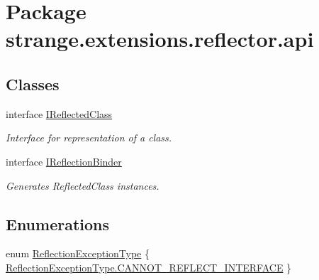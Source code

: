 \hypertarget{namespacestrange_1_1extensions_1_1reflector_1_1api}{\section{Package strange.\-extensions.\-reflector.\-api}
\label{namespacestrange_1_1extensions_1_1reflector_1_1api}
}
\subsection*{Classes}
\begin{DoxyCompactItemize}
\item 
interface \hyperlink{interfacestrange_1_1extensions_1_1reflector_1_1api_1_1_i_reflected_class}{I\-Reflected\-Class}
\begin{DoxyCompactList}\small\item\em Interface for representation of a class. \end{DoxyCompactList}\item 
interface \hyperlink{interfacestrange_1_1extensions_1_1reflector_1_1api_1_1_i_reflection_binder}{I\-Reflection\-Binder}
\begin{DoxyCompactList}\small\item\em Generates {\ttfamily Reflected\-Class} instances. \end{DoxyCompactList}\end{DoxyCompactItemize}
\subsection*{Enumerations}
\begin{DoxyCompactItemize}
\item 
enum \hyperlink{namespacestrange_1_1extensions_1_1reflector_1_1api_a4470d7d3edf61dfa229aec6e9a914159}{Reflection\-Exception\-Type} \{ \hyperlink{namespacestrange_1_1extensions_1_1reflector_1_1api_a4470d7d3edf61dfa229aec6e9a914159af31a2902a8b90d6040a9f5ac471ddc04}{Reflection\-Exception\-Type.\-C\-A\-N\-N\-O\-T\-\_\-\-R\-E\-F\-L\-E\-C\-T\-\_\-\-I\-N\-T\-E\-R\-F\-A\-C\-E}
 \}
\end{DoxyCompactItemize}


